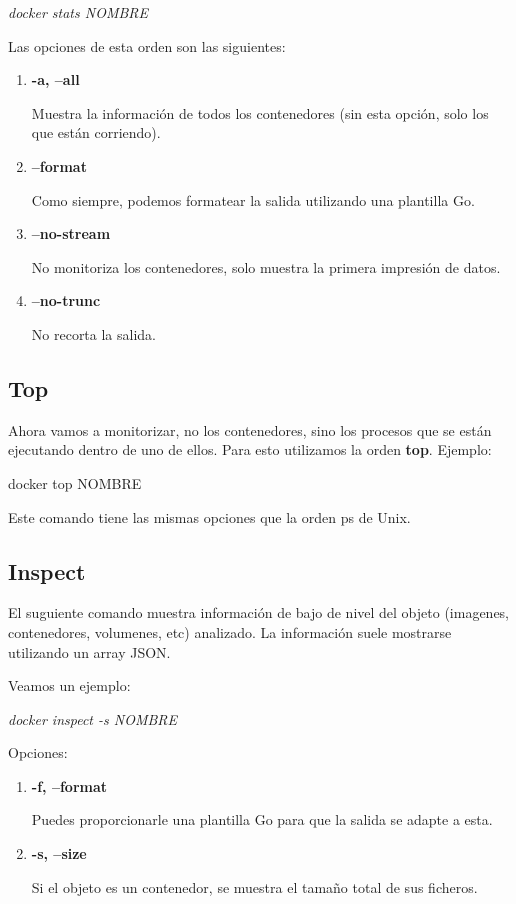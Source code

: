 \documentclass[]{article}
\begin{document}
\begin{center}
	\it
	docker stats NOMBRE
\end{center}

Las opciones de esta orden son las siguientes:

\begin{enumerate}
	\renewcommand{\labelenumi}{$\bullet$}
	
	\item {\bf -a, --all}
	
	Muestra la información de todos los contenedores (sin esta opción, solo los que están corriendo).
	\item {\bf --format}
	
	Como siempre, podemos formatear la salida utilizando una plantilla Go.
	\item {\bf --no-stream}
	
	No monitoriza los contenedores, solo muestra la primera impresión de datos.
	\item {\bf --no-trunc}
	
	No recorta la salida.

\end{enumerate}

\subsection{Top}
Ahora vamos a monitorizar, no los contenedores, sino los procesos que se están ejecutando dentro de uno de ellos.
Para esto utilizamos la orden {\bf top}.
Ejemplo:

\begin{center}
	docker top NOMBRE
\end{center}

Este comando tiene las mismas opciones que la orden ps de Unix.

\subsection{Inspect}
El suguiente comando muestra información de bajo de nivel del objeto (imagenes, contenedores, volumenes, etc) analizado.
La información suele mostrarse utilizando un array JSON.

Veamos un ejemplo:

\begin{center}
	\it
	docker inspect -s NOMBRE
\end{center}

Opciones:

\begin{enumerate}
\renewcommand{\labelenumi}{$\bullet$}

\item {\bf -f, --format}

Puedes proporcionarle una plantilla Go para que la salida se adapte a esta.
\item {\bf -s, --size}

Si el objeto es un contenedor, se muestra el tamaño total de sus ficheros.
\end{enumerate}
\end{document}
